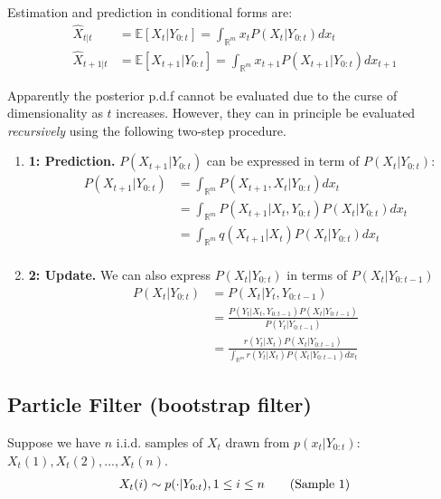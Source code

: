 \documentclass[11pt]{elegantbook}
\begin{document}
Estimation and prediction in conditional forms are:
\begin{equation}
    \begin{aligned}
        \hat{X}_{t|t}&=\mathbb{E}[X_{t}|Y_{0:t}]=\int_{\mathbb{R}^m}x_{t}P(X_{t}|Y_{0:t})dx_{t}\\
        \hat{X}_{t+1|t}&=\mathbb{E}[X_{t+1}|Y_{0:t}]=\int_{\mathbb{R}^m}x_{t+1}P(X_{t+1}|Y_{0:t})dx_{t+1}
    \end{aligned}
    \nonumber
\end{equation}

Apparently the posterior p.d.f cannot be evaluated due to the curse of dimensionality as $t$ increases. However, they can in principle be evaluated \textit{recursively} using the following two-step procedure.

\begin{enumerate}
    \item \textbf{ 1: Prediction.} $P(X_{t+1}|Y_{0:t})$ can be expressed in term of $P(X_t|Y_{0:t})$:
    \begin{equation}
        \begin{aligned}
            P(X_{t+1}|Y_{0:t})&=\int_{\mathbb{R}^m}P(X_{t+1},X_t|Y_{0:t})dx_t\\
            &=\int_{\mathbb{R}^m}P(X_{t+1}|X_t, Y_{0:t})P(X_t|Y_{0:t})dx_t\\
            &=\int_{\mathbb{R}^m}q(X_{t+1}|X_t)P(X_t|Y_{0:t})dx_t\\
        \end{aligned}
        \nonumber
    \end{equation}
    \item \textbf{ 2: Update.} We can also express $P(X_t|Y_{0:t})$ in terms of $P(X_t|Y_{0:t-1})$
    \begin{equation}
        \begin{aligned}
            P(X_{t}|Y_{0:t})&=P(X_t|Y_{t},Y_{0:t-1})\\
            &=\frac{P(Y_t|X_t,Y_{0:t-1})P(X_t|Y_{0:t-1})}{P(Y_t|Y_{0:t-1})}\\
            &=\frac{r(Y_t|X_t)P(X_t|Y_{0:t-1})}{\int_{\mathbb{R}^m}r(Y_t|X_t)P(X_t|Y_{0:t-1})dx_t}
        \end{aligned}
        \nonumber
    \end{equation}
\end{enumerate}

\subsection{Particle Filter (bootstrap filter)}
Suppose we have $n$ i.i.d. samples of $X_t$ drawn from $p(x_t|Y_{0:t})$: $X_t(1),X_t(2),...,X_t(n)$.
\begin{equation}
    \begin{aligned}
        X_{t}(i)\sim p(\cdot|Y_{0:t}),1\leq i\leq n
    \end{aligned}
    \tag{\text{Sample 1}}
\end{equation}
\end{document}
